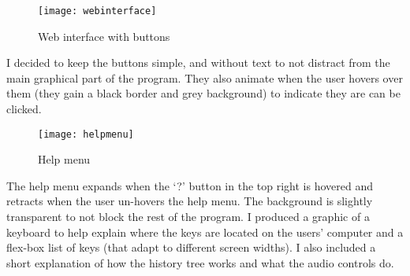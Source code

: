 \begin{figure}[H]
    \centering
    \texttt{[image: webinterface]}
    \caption{Web interface with buttons}
\end{figure}

I decided to keep the buttons simple, and without text to not distract
from the main graphical part of the program. They also animate when the user
hovers over them (they gain a black border and grey background) to indicate they
are can be clicked.

\begin{figure}[H]
    \centering
    \texttt{[image: helpmenu]}
    \caption{Help menu}
\end{figure}

The help menu expands when the `?' button in the top right is hovered and
retracts when the user un-hovers the help menu. The background is slightly
transparent to not block the rest of the program. I produced a graphic of
a keyboard to help explain where the keys are located on the users' computer and
a flex-box list of keys (that adapt to different screen widths). I also included
a short explanation of how the history tree works and what the audio controls
do.
